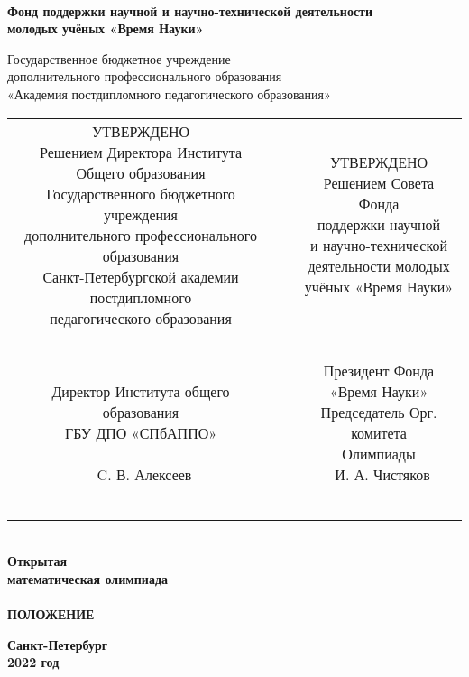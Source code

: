 \thispagestyle{empty}

\begin{center} \large\bf \ \\
	Фонд поддержки научной и научно-технической деятельности \\
	молодых учёных «Время Науки» \bigskip

	Государственное бюджетное учреждение \\
	дополнительного профессионального образования \\
	«Академия постдипломного педагогического образования» \bigskip

\normalsize
\begin{tabular}{ccc}
	\makecell[l]{
		УТВЕРЖДЕНО \\
		Решением Директора Института \\
		Общего образования \\
		Государственного бюджетного учреждения \\
		дополнительного профессионального образования \\
		Санкт-Петербургской академии постдипломного \\
		педагогического образования		
	} & \hspace{0.05cm} &
	\makecell[r]{
		УТВЕРЖДЕНО \\
		Решением Совета Фонда \\
		поддержки научной \\
		и научно-технической \\
		деятельности молодых \\
		учёных «Время Науки»
	} \\ \ & \ \\
	\makecell[l]{\ \\
		Директор Института общего образования \\
		ГБУ ДПО «СПбАППО» \\ \\
		\underline{\hspace{2.5cm}}\ C. В. Алексеев
	} & &
	\makecell[r]{
		Президент Фонда \\
		«Время Науки» \\
		Председатель Орг. комитета \\
		Олимпиады \\
		\underline{\hspace{2.5cm}}\ И. А. Чистяков
	} \\ \ & \ \\
	\makecell[l]{«\underline{\hspace{1.25cm}}»\ 
		\underline{\hspace{1.75cm}}\ 
		2022 г.}
\end{tabular} \end{center}

\vspace{1cm}

\begin{center} {\LARGE\bf \ \\
	Открытая \\
	математическая олимпиада \\
	\mns \\ [1 cm]
	ПОЛОЖЕНИЕ}
\end{center}

\vfill

\begin{center} \bf
	Санкт-Петербург \\
	2022 год
\end{center}

\newpage
